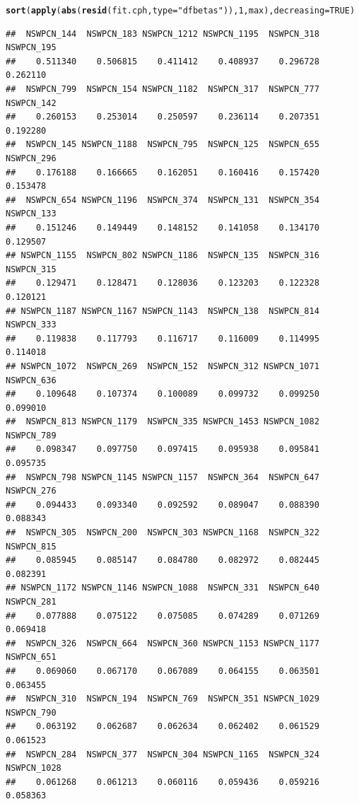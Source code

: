 \documentclass{article}\usepackage[]{graphicx}\usepackage[]{color}
\makeatletter
\newcommand{\hlnum}[1]{\textcolor[rgb]{0.686,0.059,0.569}{#1}}%
\newcommand{\hlstr}[1]{\textcolor[rgb]{0.192,0.494,0.8}{#1}}%
\newcommand{\hlstd}[1]{\textcolor[rgb]{0.345,0.345,0.345}{#1}}%
\newcommand{\hlkwc}[1]{\textcolor[rgb]{0.333,0.667,0.333}{#1}}%
\newcommand{\hlkwd}[1]{\textcolor[rgb]{0.737,0.353,0.396}{\textbf{#1}}}%
\newenvironment{kframe}{%
 \def\at@end@of@kframe{}%
 \ifinner\ifhmode%
  \def\at@end@of@kframe{\end{minipage}}%
  \begin{minipage}{\columnwidth}%
 \fi\fi%
 \def\FrameCommand##1{\hskip\@totalleftmargin \hskip-\fboxsep
 \colorbox{shadecolor}{##1}\hskip-\fboxsep
     \hskip-\linewidth \hskip-\@totalleftmargin \hskip\columnwidth}%
 \MakeFramed {\advance\hsize-\width
   \@totalleftmargin\z@ \linewidth\hsize
   \@setminipage}}%
 {\par\unskip\endMakeFramed%
 \at@end@of@kframe}
\newenvironment{knitrout}{}{} %
\makeatother
\begin{document}
\begin{knitrout}
{}


\begin{kframe}\begin{alltt}
\hlkwd{sort}\hlstd{(}\hlkwd{apply}\hlstd{(}\hlkwd{abs}\hlstd{(}\hlkwd{resid}\hlstd{(fit.cph,} \hlkwc{type} \hlstd{=} \hlstr{"dfbetas"}\hlstd{)),} \hlnum{1}\hlstd{, max),} \hlkwc{decreasing} \hlstd{=} \hlnum{TRUE}\hlstd{)}
\end{alltt}
\begin{verbatim}
##  NSWPCN_144  NSWPCN_183 NSWPCN_1212 NSWPCN_1195  NSWPCN_318  NSWPCN_195 
##    0.511340    0.506815    0.411412    0.408937    0.296728    0.262110 
##  NSWPCN_799  NSWPCN_154 NSWPCN_1182  NSWPCN_317  NSWPCN_777  NSWPCN_142 
##    0.260153    0.253014    0.250597    0.236114    0.207351    0.192280 
##  NSWPCN_145 NSWPCN_1188  NSWPCN_795  NSWPCN_125  NSWPCN_655  NSWPCN_296 
##    0.176188    0.166665    0.162051    0.160416    0.157420    0.153478 
##  NSWPCN_654 NSWPCN_1196  NSWPCN_374  NSWPCN_131  NSWPCN_354  NSWPCN_133 
##    0.151246    0.149449    0.148152    0.141058    0.134170    0.129507 
## NSWPCN_1155  NSWPCN_802 NSWPCN_1186  NSWPCN_135  NSWPCN_316  NSWPCN_315 
##    0.129471    0.128471    0.128036    0.123203    0.122328    0.120121 
## NSWPCN_1187 NSWPCN_1167 NSWPCN_1143  NSWPCN_138  NSWPCN_814  NSWPCN_333 
##    0.119838    0.117793    0.116717    0.116009    0.114995    0.114018 
## NSWPCN_1072  NSWPCN_269  NSWPCN_152  NSWPCN_312 NSWPCN_1071  NSWPCN_636 
##    0.109648    0.107374    0.100089    0.099732    0.099250    0.099010 
##  NSWPCN_813 NSWPCN_1179  NSWPCN_335 NSWPCN_1453 NSWPCN_1082  NSWPCN_789 
##    0.098347    0.097750    0.097415    0.095938    0.095841    0.095735 
##  NSWPCN_798 NSWPCN_1145 NSWPCN_1157  NSWPCN_364  NSWPCN_647  NSWPCN_276 
##    0.094433    0.093340    0.092592    0.089047    0.088390    0.088343 
##  NSWPCN_305  NSWPCN_200  NSWPCN_303 NSWPCN_1168  NSWPCN_322  NSWPCN_815 
##    0.085945    0.085147    0.084780    0.082972    0.082445    0.082391 
## NSWPCN_1172 NSWPCN_1146 NSWPCN_1088  NSWPCN_331  NSWPCN_640  NSWPCN_281 
##    0.077888    0.075122    0.075085    0.074289    0.071269    0.069418 
##  NSWPCN_326  NSWPCN_664  NSWPCN_360 NSWPCN_1153 NSWPCN_1177  NSWPCN_651 
##    0.069060    0.067170    0.067089    0.064155    0.063501    0.063455 
##  NSWPCN_310  NSWPCN_194  NSWPCN_769  NSWPCN_351 NSWPCN_1029  NSWPCN_790 
##    0.063192    0.062687    0.062634    0.062402    0.061529    0.061523 
##  NSWPCN_284  NSWPCN_377  NSWPCN_304 NSWPCN_1165  NSWPCN_324 NSWPCN_1028 
##    0.061268    0.061213    0.060116    0.059436    0.059216    0.058363 

\end{verbatim}
\end{kframe}
\end{knitrout}
\end{document}
